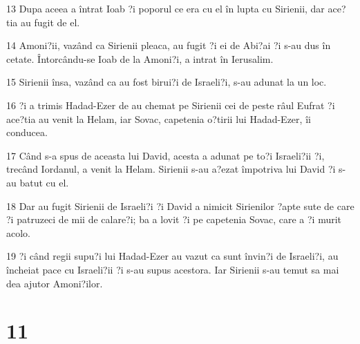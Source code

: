 \par 13 Dupa aceea a întrat Ioab ?i poporul ce era cu el în lupta cu Sirienii, dar ace?tia au fugit de el.
\par 14 Amoni?ii, vazând ca Sirienii pleaca, au fugit ?i ei de Abi?ai ?i s-au dus în cetate. Întorcându-se Ioab de la Amoni?i, a intrat în Ierusalim.
\par 15 Sirienii însa, vazând ca au fost birui?i de Israeli?i, s-au adunat la un loc.
\par 16 ?i a trimis Hadad-Ezer de au chemat pe Sirienii cei de peste râul Eufrat ?i ace?tia au venit la Helam, iar Sovac, capetenia o?tirii lui Hadad-Ezer, îi conducea.
\par 17 Când s-a spus de aceasta lui David, acesta a adunat pe to?i Israeli?ii ?i, trecând Iordanul, a venit la Helam. Sirienii s-au a?ezat împotriva lui David ?i s-au batut cu el.
\par 18 Dar au fugit Sirienii de Israeli?i ?i David a nimicit Sirienilor ?apte sute de care ?i patruzeci de mii de calare?i; ba a lovit ?i pe capetenia Sovac, care a ?i murit acolo.
\par 19 ?i când regii supu?i lui Hadad-Ezer au vazut ca sunt învin?i de Israeli?i, au încheiat pace cu Israeli?ii ?i s-au supus acestora. Iar Sirienii s-au temut sa mai dea ajutor Amoni?ilor.

\chapter{11}

